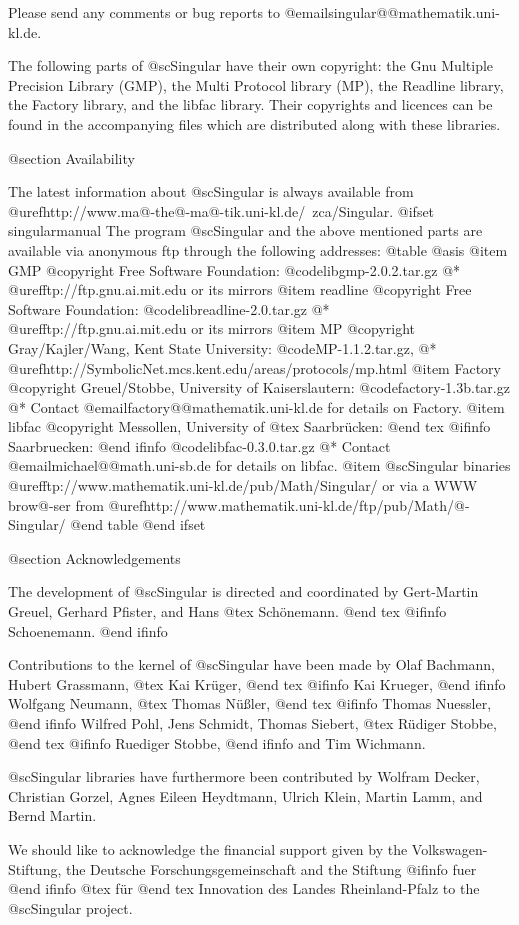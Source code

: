 Please send any comments or bug reports to
@email{singular@@mathematik.uni-kl.de}.

The following parts of @sc{Singular} have their own copyright: the Gnu Multiple
Precision Library (GMP), the Multi Protocol library (MP), the Readline library,
the Factory library, and the libfac library.
Their copyrights and licences can be found in the accompanying files
which are distributed along with these libraries.

@section Availability

The latest information about @sc{Singular} is always available from
@uref{http://www.ma@-the@-ma@-tik.uni-kl.de/~zca/Singular}.
@ifset singularmanual
The program @sc{Singular} and the above mentioned parts are available via
anonymous ftp through the following addresses:
@table @asis
@item GMP
@copyright{} Free Software Foundation:
@code{libgmp-2.0.2.tar.gz}
@* @uref{ftp://ftp.gnu.ai.mit.edu} or its mirrors
@item readline
@copyright{} Free Software Foundation:
@code{libreadline-2.0.tar.gz}
@* @uref{ftp://ftp.gnu.ai.mit.edu} or its mirrors
@item MP
@copyright{} Gray/Kajler/Wang, Kent State University:
@code{MP-1.1.2.tar.gz},
@* @uref{http://SymbolicNet.mcs.kent.edu/areas/protocols/mp.html}
@item Factory
@copyright{} Greuel/Stobbe, University of Kaiserslautern:
@code{factory-1.3b.tar.gz}
@* Contact @email{factory@@mathematik.uni-kl.de} for details on Factory.
@item libfac
@copyright{}  Messollen, University of
@tex
Saarbr\"ucken:
@end tex
@ifinfo
Saarbruecken:
@end ifinfo
@code{libfac-0.3.0.tar.gz}
@* Contact @email{michael@@math.uni-sb.de} for details on libfac.
@item @sc{Singular} binaries
@uref{ftp://www.mathematik.uni-kl.de/pub/Math/Singular/} or via a
WWW brow@-ser from
@uref{http://www.mathematik.uni-kl.de/ftp/pub/Math/@-Singular/}
@end table
@end ifset

@section Acknowledgements

The development of @sc{Singular} is directed and coordinated by
Gert-Martin Greuel, Gerhard Pfister, and Hans
@tex
Sch\"onemann.
@end tex
@ifinfo
Schoenemann.
@end ifinfo

Contributions to the kernel of @sc{Singular} have been made by
Olaf Bachmann,
Hubert Grassmann,
@tex
Kai Kr\"uger,
@end tex
@ifinfo
Kai Krueger,
@end ifinfo
Wolfgang Neumann,
@tex
Thomas N\"u{\ss}ler,
@end tex
@ifinfo
Thomas Nuessler,
@end ifinfo
Wilfred Pohl,
Jens Schmidt,
Thomas Siebert,
@tex
R\"udiger Stobbe,
@end tex
@ifinfo
Ruediger Stobbe,
@end ifinfo
and
Tim Wichmann.

@sc{Singular} libraries have furthermore been contributed by
Wolfram Decker,
Christian Gorzel,
Agnes Eileen Heydtmann,
Ulrich Klein,
Martin Lamm,
and
Bernd Martin.

We should like to acknowledge the financial support given by
the Volkswagen-Stiftung,
the Deutsche Forschungsgemeinschaft
and the Stiftung
@ifinfo
fuer
@end ifinfo
@tex
f\"ur
@end tex
Innovation des Landes Rheinland-Pfalz
to the
@sc{Singular} project.

